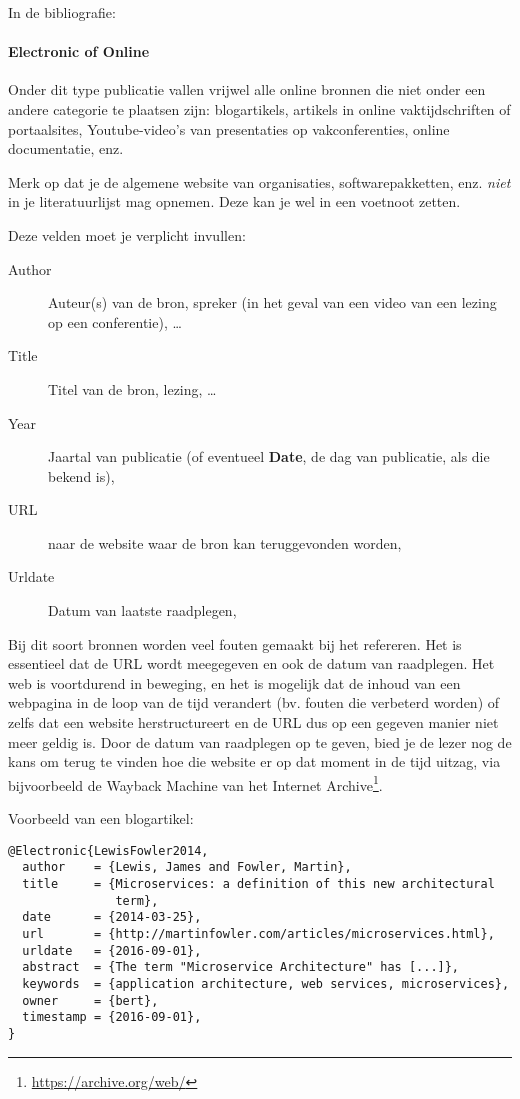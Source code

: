 In de bibliografie: 


\paragraph{Electronic of Online}

Onder dit type publicatie vallen vrijwel alle online bronnen die niet onder een andere categorie te plaatsen zijn: blogartikels, artikels in online vaktijdschriften of portaalsites, Youtube-video's van presentaties op vakconferenties, online documentatie, enz.

Merk op dat je de algemene website van organisaties, softwarepakketten, enz. \emph{niet} in je literatuurlijst mag opnemen. Deze kan je wel in een voetnoot zetten.

Deze velden moet je verplicht invullen:

\begin{description}
  \item[Author] Auteur(s) van de bron, spreker (in het geval van een video van een lezing op een conferentie), \ldots
  \item[Title] Titel van de bron, lezing, \ldots
  \item[Year] Jaartal van publicatie (of eventueel \textbf{Date}, de dag van publicatie, als die bekend is),
  \item[URL] naar de website waar de bron kan teruggevonden worden,
  \item[Urldate] Datum van laatste raadplegen,
\end{description}

Bij dit soort bronnen worden veel fouten gemaakt bij het refereren. Het is essentieel dat de URL wordt meegegeven en ook de datum van raadplegen. Het web is voortdurend in beweging, en het is mogelijk dat de inhoud van een webpagina in de loop van de tijd verandert (bv. fouten die verbeterd worden) of zelfs dat een website herstructureert en de URL dus op een gegeven manier niet meer geldig is. Door de datum van raadplegen op te geven, bied je de lezer nog de kans om terug te vinden hoe die website er op dat moment in de tijd uitzag, via bijvoorbeeld de Wayback Machine van het Internet Archive\footnote{\url{https://archive.org/web/}}.

Voorbeeld van een blogartikel:

\begin{verbatim}
@Electronic{LewisFowler2014,
  author    = {Lewis, James and Fowler, Martin},
  title     = {Microservices: a definition of this new architectural
               term},
  date      = {2014-03-25},
  url       = {http://martinfowler.com/articles/microservices.html},
  urldate   = {2016-09-01},
  abstract  = {The term "Microservice Architecture" has [...]},
  keywords  = {application architecture, web services, microservices},
  owner     = {bert},
  timestamp = {2016-09-01},
}
\end{verbatim}

